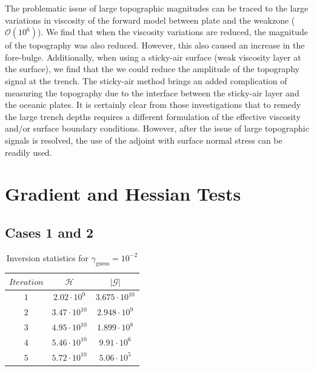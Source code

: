 \documentclass[12pt]{article}
\begin{document}
 
  The problematic issue of large topographic magnitudes can be traced to the large variations in viscosity of the forward model between plate and the weakzone ($\mathcal{O}(10^6)$). We find that when the viscosity variations are reduced, the magnitude of the topography was also reduced. However, this also caused an increase in the fore-bulge. Additionally, when using a sticky-air surface (weak viscosity layer at the surface), we find that the we could reduce the amplitude of the topography signal at the trench. The sticky-air method brings an added complication of measuring the topography due to the interface between the sticky-air layer and the oceanic plates. It is certainly clear from those investigations that to remedy the large trench depths requires a different formulation of the effective viscosity and/or surface boundary conditions. However, after the issue of large topographic signals is resolved, the use of the adjoint with surface normal stress can be readily used.




\appendix
\section{Gradient and Hessian Tests}
\subsection{Cases 1 and 2}
\begin{table}[H]
		\caption{Inversion statistics for $\gamma_{\text{guess}}= 10^{-2}$} %
		\centering  %
		\begin{tabular}{c c c } %
		\hline \hline                        %
 		$Iteration$&$\mathcal H$ &$|\mathcal G|$   \\ [0.5ex] %
		\hline                  %
                $1$&$2.02\cdot 10^{9}$&$3.675\cdot 10^{10}$   \\
		$2$&$3.47\cdot 10^{10}$&$2.948\cdot 10^{9}$   \\
                $3$&$4.95\cdot 10^{10}$&$1.899\cdot 10^{8}$   \\
		$4$&$5.46\cdot 10^{10}$&$9.91\cdot 10^{6}$   \\
		$5$&$5.72\cdot 10^{10}$&$5.06\cdot 10^{5}$   \\

                \hline %
		\end{tabular}
		\label{table:gradcheck1} %
		\end{table}
 
\end{document}
